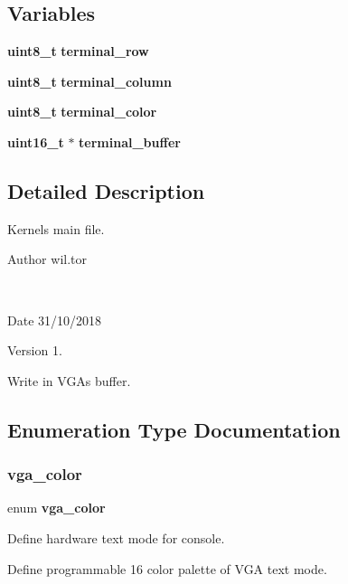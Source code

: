 \subsection*{Variables}
\begin{DoxyCompactItemize}
\item 
\mbox{\label{kernel_8c_a8bb65c78998dc43716e51c11a38e23d6}} 
\textbf{ uint8\+\_\+t} {\bfseries terminal\+\_\+row}
\item 
\mbox{\label{kernel_8c_adfadf4bb39940ae59774731f41520ff8}} 
\textbf{ uint8\+\_\+t} {\bfseries terminal\+\_\+column}
\item 
\mbox{\label{kernel_8c_a0165452ad102b2a781847d6616407976}} 
\textbf{ uint8\+\_\+t} {\bfseries terminal\+\_\+color}
\item 
\mbox{\label{kernel_8c_a47e72657e89c79ddc7393b941112a28e}} 
\textbf{ uint16\+\_\+t} $\ast$ {\bfseries terminal\+\_\+buffer}
\end{DoxyCompactItemize}


\subsection{Detailed Description}
Kernel\textquotesingle{}s main file. 

\begin{DoxyAuthor}{Author}
wil.\+tor
\end{DoxyAuthor}
 \begin{DoxyDate}{Date}
31/10/2018
\end{DoxyDate}
\begin{DoxyVersion}{Version}
1.
\end{DoxyVersion}
Write in V\+GA\textquotesingle{}s buffer. 

\subsection{Enumeration Type Documentation}
\mbox{\label{kernel_8c_abaae057bae62d0c3e11501e3199cb60e}} 
\subsubsection{vga\+\_\+color}
{\footnotesize\ttfamily enum \textbf{ vga\+\_\+color}}



Define hardware text mode for console. 

Define programmable 16 color palette of V\+GA text mode. 

